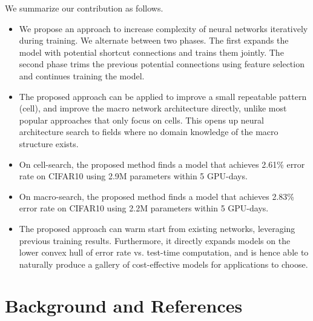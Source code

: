 We summarize our contribution as follows.
\begin{itemize}
\item We propose an approach to increase complexity of neural networks iteratively during training. We alternate between two phases. The first expands the model with potential shortcut connections and trains them jointly. The second phase trims the previous potential connections using feature selection and continues training the model. 
\item The proposed approach can be applied to improve a small repeatable pattern (cell), and improve the macro network architecture directly, unlike most popular approaches that only focus on cells. This opens up neural architecture search to fields where no domain knowledge of the macro structure exists. 
\item On cell-search, the proposed method finds a model that achieves 2.61\% error rate on CIFAR10 using 2.9M parameters within 5 GPU-days. 
\item On macro-search, the proposed method finds a model that achieves 2.83\% error rate on CIFAR10 using 2.2M parameters within 5 GPU-days. 
\item The proposed approach can warm start from existing networks, leveraging previous training results. Furthermore, it directly expands models on the lower convex hull of error rate vs. test-time computation, and is hence able to naturally produce a gallery of cost-effective models for applications to choose. 
\end{itemize}


\section{Background and References}

